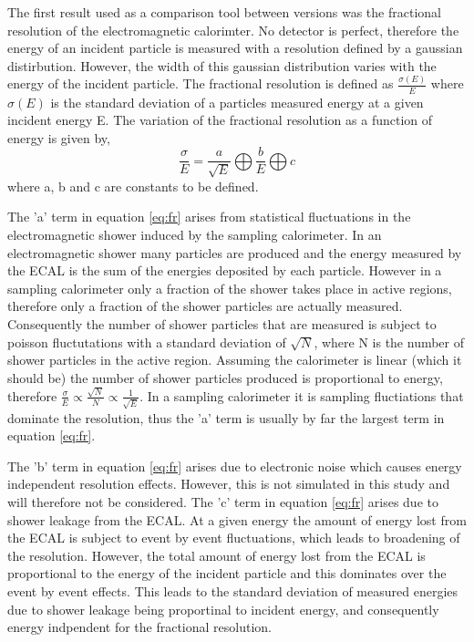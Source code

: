 The first result used as a comparison tool between \geant versions was the fractional resolution of the electromagnetic calorimter.  No detector is perfect, therefore the energy of an incident particle is measured with a resolution defined by a gaussian distirbution.  However, the width of this gaussian distribution varies with the energy of the incident particle.  The fractional resolution is defined as $\frac{\sigma(E)}{E}$ where $\sigma(E)$ is the standard deviation of a particles measured energy at a given incident energy E.  The variation of the fractional resolution as a function of energy is given by, 
\begin{equation}\label{eq:fr}
\frac{\sigma}{E}=\frac{a}{\sqrt{E}} \bigoplus \frac{b}{E} \bigoplus c
\end{equation}
where a, b and c are constants to be defined\cite{wigmans2000calorimetry}.  

The 'a' term in equation \ref{eq:fr} arises from statistical fluctuations in the electromagnetic shower induced by the sampling calorimeter.  In an electromagnetic shower many particles are produced and the energy measured by the ECAL is the sum of the energies deposited by each particle.  However in a sampling calorimeter only a fraction of the shower takes place in active regions, therefore only a fraction of the shower particles are actually measured.  Consequently the number of shower particles that are measured is subject to poisson fluctutations with a standard deviation of $\sqrt{N}$, where N is the number of shower particles in the active region.  Assuming the calorimeter is linear (which it should be) the number of shower particles produced is proportional to energy, therefore $\frac{\sigma}{E} \propto \frac{\sqrt{N}}{N} \propto \frac{1}{\sqrt{E}}$. In a sampling calorimeter it is sampling fluctiations that dominate the resolution, thus the 'a' term is usually by far the largest term in equation \ref{eq:fr}.  

The 'b' term in equation \ref{eq:fr} arises due to electronic noise which causes energy independent resolution effects.  However, this is not simulated in this study and will therefore not be considered.  The 'c' term in equation \ref{eq:fr} arises due to shower leakage from the ECAL.  At a given energy the amount of energy lost from the ECAL is subject to event by event fluctuations, which leads to broadening of the resolution.  However, the total amount of energy lost from the ECAL is proportional to the energy of the incident particle and this dominates over the event by event effects.  This leads to the standard deviation of measured energies due to shower leakage being proportinal to incident energy, and consequently energy indpendent for the fractional resolution.

